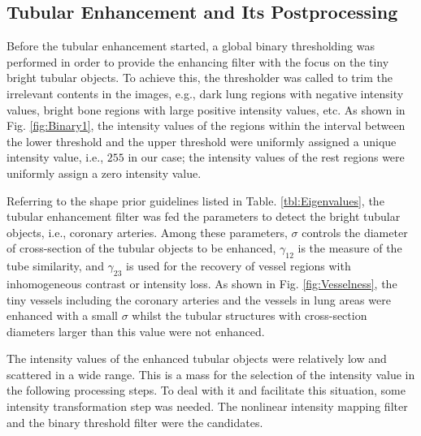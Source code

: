 \subsection{Tubular Enhancement and Its Postprocessing}

Before the tubular enhancement started, a global binary thresholding was performed in order to provide the enhancing filter with the focus on the tiny bright tubular objects.
To achieve this, the thresholder was called to trim the irrelevant contents in the images, e.g., dark lung regions with negative intensity values, bright bone regions with large positive intensity values, etc. %
As shown in Fig. \ref{fig:Binary1}, the intensity values of the regions within the interval between the lower threshold and the upper threshold were uniformly assigned a unique intensity value, i.e., $255$ in our case; the intensity values of the rest regions were uniformly assign a zero intensity value. %

Referring to the shape prior guidelines listed in Table. \ref{tbl:Eigenvalues}, the tubular enhancement filter was fed the parameters to detect the bright tubular objects, i.e., coronary arteries. %
Among these parameters, $\sigma$ controls the diameter of cross-section of the tubular objects to be enhanced, $\gamma_{12}$ is the measure of the tube similarity, and $\gamma_{23}$ is used for the recovery of vessel regions with inhomogeneous contrast or intensity loss. %
As shown in Fig. \ref{fig:Vesselness}, the tiny vessels including the coronary arteries and the vessels in lung areas were enhanced with a small $\sigma$ whilst the tubular structures with cross-section diameters larger than this value were not enhanced. %

The intensity values of the enhanced tubular objects were relatively low and scattered in a wide range.
This is a mass for the selection of the intensity value in the following processing steps.
To deal with it and facilitate this situation, some intensity transformation step was needed.
The nonlinear intensity mapping filter and the binary threshold filter were the candidates.

